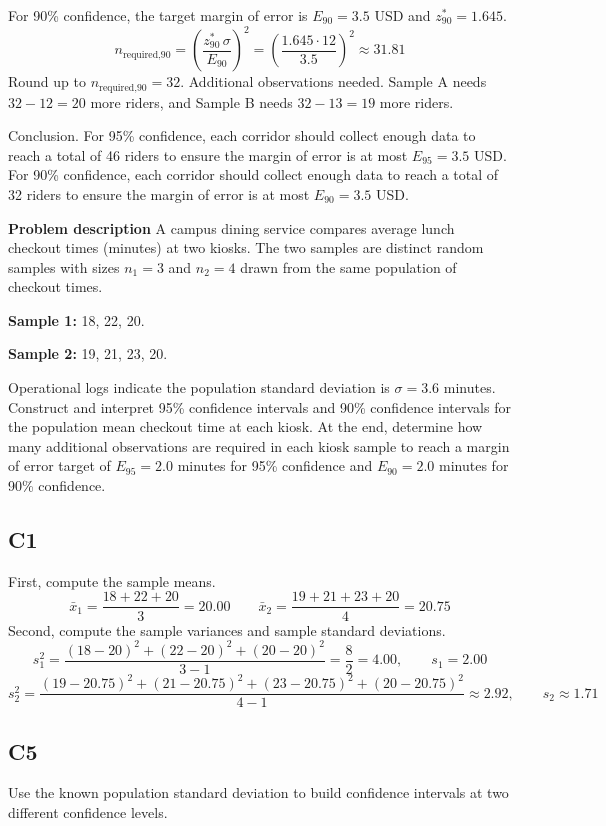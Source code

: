 \begin{ExamProblems}
		For 90\% confidence, the target margin of error is $E_{90} = 3.5$ USD and $z^*_{90} = 1.645$.
		\[
		n_{\text{required,90}} = \left(\frac{z^*_{90}\,\sigma}{E_{90}}\right)^2
		= \left(\frac{1.645 \cdot 12}{3.5}\right)^2
		\approx 31.81
		\]
		Round up to $n_{\text{required,90}} = 32$.
		Additional observations needed.
		Sample A needs $32 - 12 = 20$ more riders, and Sample B needs $32 - 13 = 19$ more riders.
		
		Conclusion.
		For 95\% confidence, each corridor should collect enough data to reach a total of 46 riders to ensure the margin of error is at most $E_{95} = 3.5$ USD.
		For 90\% confidence, each corridor should collect enough data to reach a total of 32 riders to ensure the margin of error is at most $E_{90} = 3.5$ USD.
		
		\newpage
		\item
		\textbf{Problem description}
		A campus dining service compares average lunch checkout times (minutes) at two kiosks.
		The two samples are distinct random samples with sizes $n_1 = 3$ and $n_2 = 4$ drawn from the same population of checkout times.
		
		\textbf{Sample 1:} 18, 22, 20.
		
		\textbf{Sample 2:} 19, 21, 23, 20.
		
		Operational logs indicate the population standard deviation is $\sigma = 3.6$ minutes.
		Construct and interpret 95\% confidence intervals and 90\% confidence intervals for the population mean checkout time at each kiosk.
		At the end, determine how many additional observations are required in each kiosk sample to reach a margin of error target of $E_{95} = 2.0$ minutes for 95\% confidence and $E_{90} = 2.0$ minutes for 90\% confidence.
		
		\subsection*{C1}
		First, compute the sample means.
		\[
		\bar{x}_1 = \frac{18 + 22 + 20}{3} = 20.00
		\qquad
		\bar{x}_2 = \frac{19 + 21 + 23 + 20}{4} = 20.75
		\]
		Second, compute the sample variances and sample standard deviations.
		\[
		s_1^2 = \frac{(18-20)^2 + (22-20)^2 + (20-20)^2}{3-1} = \frac{8}{2} = 4.00,
		\qquad s_1 = 2.00
		\]
		\[
		s_2^2 = \frac{(19-20.75)^2 + (21-20.75)^2 + (23-20.75)^2 + (20-20.75)^2}{4-1} \approx 2.92,
		\qquad s_2 \approx 1.71
		\]
		
		\subsection*{C5}
		Use the known population standard deviation to build confidence intervals at two different confidence levels.
		

\end{ExamProblems}
